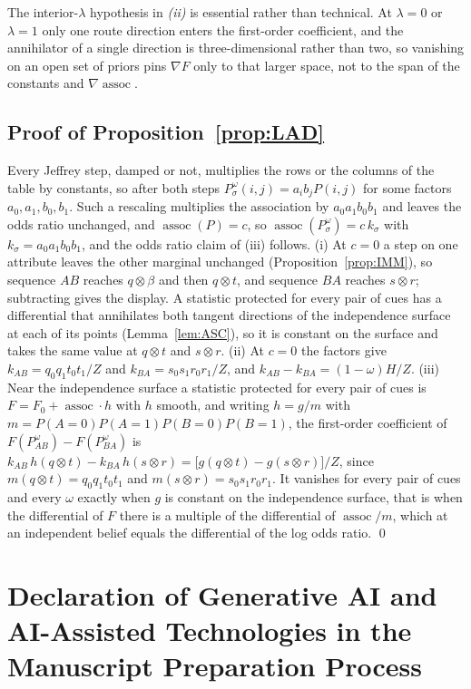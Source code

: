 \documentclass[a4paper,fleqn]{cas-sc}
\theoremstyle{remark}
\theoremstyle{definition}
\newcommand{\assoc}{\operatorname{assoc}}
\begin{document}
The interior-$\lambda$ hypothesis in \emph{(ii)} is essential rather than technical. At
$\lambda=0$ or $\lambda=1$ only one route direction enters the first-order coefficient, and
the annihilator of a single direction is three-dimensional rather than two, so vanishing on
an open set of priors pins $\nabla F$ only to that larger space, not to the span of the
constants and $\nabla\assoc$.


\subsection{Proof of Proposition~\ref{prop:LAD}}

Every Jeffrey step, damped or not, multiplies the rows or the columns of the table
by constants, so after both steps $P^{\omega}_{\sigma}(i,j)=a_i b_j P(i,j)$ for some
factors $a_0,a_1,b_0,b_1$. Such a rescaling multiplies the association by
$a_0a_1b_0b_1$ and leaves the odds ratio unchanged, and $\assoc(P)=c$, so
$\assoc(P^{\omega}_{\sigma})=c\,k_\sigma$ with $k_\sigma=a_0a_1b_0b_1$, and the odds
ratio claim of (iii) follows. (i) At $c=0$ a step on one attribute leaves the other
marginal unchanged (Proposition~\ref{prop:IMM}), so sequence $AB$ reaches $q\otimes\beta$
and then $q\otimes t$, and sequence $BA$ reaches $s\otimes r$; subtracting gives the
display. A statistic protected for every pair of cues has a differential that
annihilates both tangent directions of the independence surface at each of its
points (Lemma~\ref{lem:ASC}), so it is constant on the surface and takes the same
value at $q\otimes t$ and $s\otimes r$. (ii) At $c=0$ the factors give
$k_{AB}=q_0q_1t_0t_1/Z$ and $k_{BA}=s_0s_1r_0r_1/Z$, and $k_{AB}-k_{BA}=(1-\omega)H/Z$.
(iii) Near the independence surface a statistic protected for every pair of cues
is $F=F_0+\assoc\cdot h$ with $h$ smooth, and writing $h=g/m$ with
$m=P(A{=}0)P(A{=}1)P(B{=}0)P(B{=}1)$, the first-order coefficient of
$F(P^{\omega}_{AB})-F(P^{\omega}_{BA})$ is
$k_{AB}\,h(q\otimes t)-k_{BA}\,h(s\otimes r)=\bigl[g(q\otimes t)-g(s\otimes r)\bigr]/Z$,
since $m(q\otimes t)=q_0q_1t_0t_1$ and $m(s\otimes r)=s_0s_1r_0r_1$. It vanishes for
every pair of cues and every $\omega$ exactly when $g$ is constant on the
independence surface, that is when the differential of $F$ there is a multiple of
the differential of $\assoc/m$, which at an independent belief equals the
differential of the log odds ratio.
\qed

\section*{Declaration of Generative AI and AI-Assisted Technologies in the Manuscript Preparation Process}
\end{document}
